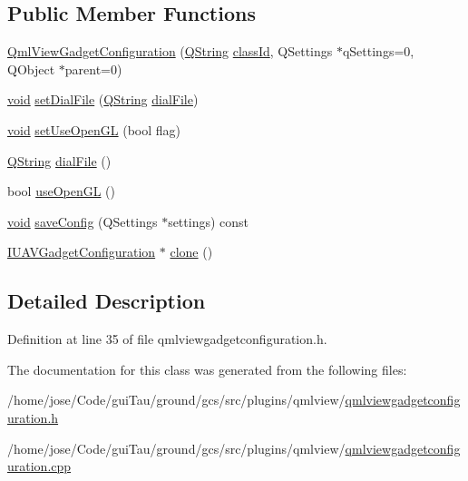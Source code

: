 \subsection*{Public Member Functions}
\begin{DoxyCompactItemize}
\item 
\hyperlink{group___o_p_map_plugin_gac44e73d868f1af30be54bb966ffc1998}{Qml\-View\-Gadget\-Configuration} (\hyperlink{group___u_a_v_objects_plugin_gab9d252f49c333c94a72f97ce3105a32d}{Q\-String} \hyperlink{group___core_plugin_gac953657221ba7fda967ada0408332641}{class\-Id}, Q\-Settings $\ast$q\-Settings=0, Q\-Object $\ast$parent=0)
\item 
\hyperlink{group___u_a_v_objects_plugin_ga444cf2ff3f0ecbe028adce838d373f5c}{void} \hyperlink{group___o_p_map_plugin_ga3811e60e4028c59e57997daf43edc66a}{set\-Dial\-File} (\hyperlink{group___u_a_v_objects_plugin_gab9d252f49c333c94a72f97ce3105a32d}{Q\-String} \hyperlink{group___o_p_map_plugin_ga797d73a96488915da65e8cd79ceac1fe}{dial\-File})
\item 
\hyperlink{group___u_a_v_objects_plugin_ga444cf2ff3f0ecbe028adce838d373f5c}{void} \hyperlink{group___o_p_map_plugin_ga9613450d5753ab06673c80b0d137cbe8}{set\-Use\-Open\-G\-L} (bool flag)
\item 
\hyperlink{group___u_a_v_objects_plugin_gab9d252f49c333c94a72f97ce3105a32d}{Q\-String} \hyperlink{group___o_p_map_plugin_ga797d73a96488915da65e8cd79ceac1fe}{dial\-File} ()
\item 
bool \hyperlink{group___o_p_map_plugin_ga64a5c04c8b5ac9f81ebeb1e573c1d1c7}{use\-Open\-G\-L} ()
\item 
\hyperlink{group___u_a_v_objects_plugin_ga444cf2ff3f0ecbe028adce838d373f5c}{void} \hyperlink{group___o_p_map_plugin_gada9019ef4d25aa0e87788713af1d1d72}{save\-Config} (Q\-Settings $\ast$settings) const 
\item 
\hyperlink{group___core_plugin_gacdfdf0b1e39b5002472b76b6564ce51f}{I\-U\-A\-V\-Gadget\-Configuration} $\ast$ \hyperlink{group___o_p_map_plugin_gab4f87dbc27b19e319ea02819e3574853}{clone} ()
\end{DoxyCompactItemize}


\subsection{Detailed Description}


Definition at line 35 of file qmlviewgadgetconfiguration.\-h.



The documentation for this class was generated from the following files\-:\begin{DoxyCompactItemize}
\item 
/home/jose/\-Code/gui\-Tau/ground/gcs/src/plugins/qmlview/\hyperlink{qmlviewgadgetconfiguration_8h}{qmlviewgadgetconfiguration.\-h}\item 
/home/jose/\-Code/gui\-Tau/ground/gcs/src/plugins/qmlview/\hyperlink{qmlviewgadgetconfiguration_8cpp}{qmlviewgadgetconfiguration.\-cpp}\end{DoxyCompactItemize}
